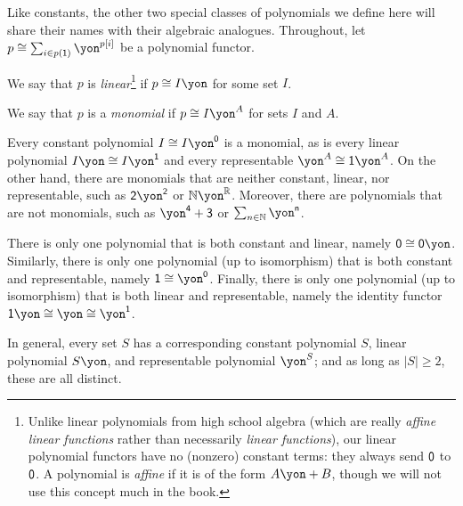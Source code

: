 \documentclass[Book-Poly]{subfiles}
\begin{document}
Like constants, the other two special classes of polynomials we define here will share their names with their algebraic analogues.
Throughout, let $p\iso\sum_{i\in p(\1)}\yon^{p[i]}$ be a polynomial functor.

\begin{definition}
We say that $p$ is \emph{linear}\footnote{Unlike linear polynomials from high school algebra (which are really \emph{affine linear functions} rather than necessarily \emph{linear functions}), our linear polynomial functors have no (nonzero) constant terms: they always send $\textsf{0}$ to $\textsf{0}$. A polynomial is \emph{affine} if it is of the form $A\yon+B$, though we will not use this concept much in the book.}
if $p\iso I\yon$ for some set $I$.
\end{definition}

\begin{definition}[Monomial]
We say that $p$ is a \emph{monomial} if $p\iso I\yon^A$ for sets $I$ and $A$.
\end{definition}

\begin{example}
  Every constant polynomial $I\iso I\yon^\0$ is a monomial, as is every linear polynomial $I\yon\iso I\yon^\1$ and every representable $\yon^A \iso \1\yon^A$.
  On the other hand, there are monomials that are neither constant, linear, nor representable, such as $\2\yon^\2$ or $\nn\yon^\rr$.
  Moreover, there are polynomials that are not monomials, such as $\yon^\4+\3$ or $\sum_{n\in\nn}\yon^{\ord{n}}$.

  There is only one polynomial that is both constant and linear, namely $\0\iso\0\yon$.
  Similarly, there is only one polynomial (up to isomorphism) that is both constant and representable, namely $\1\iso\yon^\0$.
  Finally, there is only one polynomial (up to isomorphism) that is both linear and representable, namely the identity functor $\1\yon\iso\yon\iso\yon^\1$.

  In general, every set $S$ has a corresponding constant polynomial $S$, linear polynomial $S\yon$, and representable polynomial $\yon^S$; and as long as $|S|\geq2$, these are all distinct.
\end{example}
\end{document}
